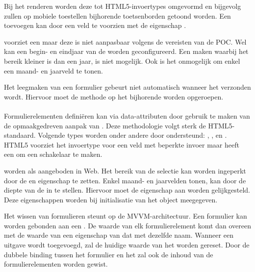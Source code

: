 Bij het renderen worden deze tot HTML5-invoertypes omgevormd en bijgevolg zullen op mobiele toestellen bijhorende toetsenborden getoond worden.
Een  toevoegen kan door een veld te voorzien met de eigenschap .

\st{} voorziet een  maar deze is niet aanpasbaar volgens de vereisten van de POC.
Wel kan een begin- en eindjaar van de  worden geconfigureerd.
Een  maken waarbij het bereik kleiner is dan een jaar, is niet mogelijk.
Ook is het onmogelijk om enkel een maand- en jaarveld te tonen.

Het leegmaken van een formulier gebeurt niet automatisch wanneer het verzonden wordt.
Hiervoor moet de  methode op het bijhorende  worden opgeroepen.

\paragraph{\kendo}
 Formulierelementen definiëren kan via data-attributen door gebruik te maken van de opmaakgedreven aanpak van \kendo.
 Deze methodologie volgt sterk de HTML5-standaard.
 Volgende types worden onder andere door \kendo{} ondersteund:  , ,  en .
 HTML5 voorziet het invoertype  voor een veld met beperkte invoer maar \kendo{} heeft een  om een schakelaar te maken.

  worden als  aangeboden in \kendo{} Web.
 Het bereik van de selectie kan worden ingeperkt door de  en  eigenschap te zetten.
 Enkel maand- en jaarvelden tonen, kan door de diepte van de  in te stellen.
 Hiervoor moet de eigenschap  aan  worden gelijkgesteld.
 Deze eigenschappen worden bij initialisatie van het object meegegeven.
 
 Het wissen van formulieren steunt op de MVVM-architectuur.
 Een formulier kan worden gebonden aan een .
 De waarde van elk formulierelement komt dan overeen met de waarde van een eigenschap van dat  met dezelfde naam.
 Wanneer een uitgave wordt toegevoegd, zal de huidige waarde van het  worden gereset.
 Door de dubbele binding tussen het formulier en het  zal ook de inhoud van de formulierelementen worden gewist.
 
